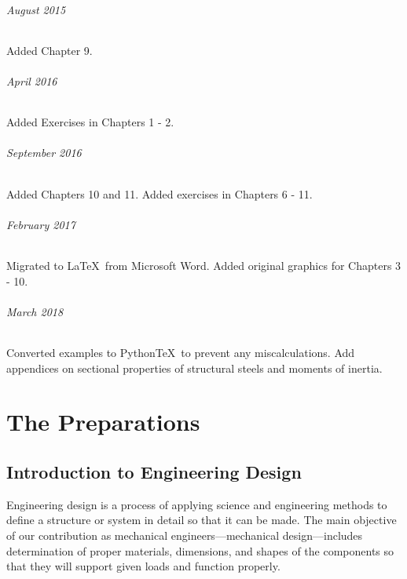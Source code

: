 \documentclass[
10pt,
a4paper,
openany,
svgnames,
]{book}
\begin{document}
\paragraph{August 2015}
Added Chapter 9.

\paragraph{April 2016}
Added Exercises in Chapters 1 - 2.

\paragraph{September 2016}
Added Chapters 10 and 11. Added exercises in Chapters 6 - 11.

\paragraph{February 2017}
Migrated to \LaTeX\ from Microsoft Word. Added original graphics for Chapters 3 - 10.

\paragraph{March 2018}
Converted examples to Python\TeX\ to prevent any miscalculations. Add appendices on sectional properties of structural steels and moments of inertia.

\tableofcontents

\listoffigures

\listoftables

\mainmatter

\part{The Preparations}


\chapter{Introduction to Engineering Design}

Engineering design is a process of applying science and engineering methods to define a structure or system in detail so that it can be made. The main objective of our contribution as mechanical engineers—mechanical design—includes determination of proper materials, dimensions, and shapes of the components so that they will support given loads and function properly.
\end{document}

